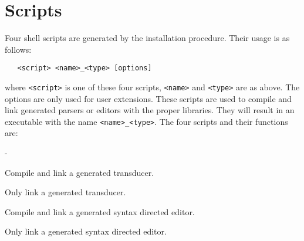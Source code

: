 \section {Scripts}
Four shell scripts are generated by the installation procedure.
Their usage is as follows:
\begin{verbatim}
   <script> <name>_<type> [options]
\end{verbatim}
where \verb+<script>+ is one of these four scripts, \verb+<name>+
and \verb+<type>+ are as above. The options are only used for user
extensions. These scripts are used to compile and link generated
parsers or editors with the proper libraries. They will result
in an executable with the name \verb+<name>_<type>+. The four
scripts and their functions are:
\begin {list}{-}
{\setlength \leftmargin {5em}
\setlength {}
\setlength {}}
\item [{\tt eagcc}] Compile and link a generated transducer.
\item [{\tt eagccl}] Only link a generated transducer.
\item [{\tt eaged}] Compile and link a generated syntax directed editor.
\item [{\tt eagedl}] Only link a generated syntax directed editor.
\end {list}
